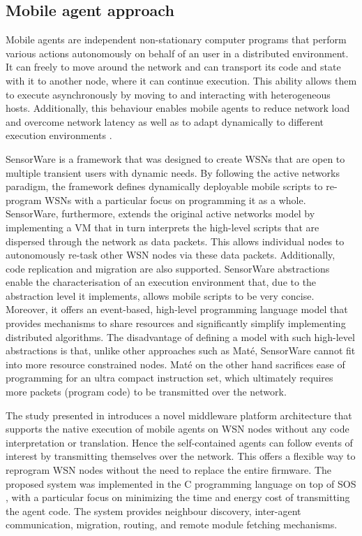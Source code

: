 \subsection{Mobile agent approach}
Mobile agents are independent non-stationary computer programs that perform various actions autonomously on behalf of an user in a distributed environment. It can freely to move around the network and can transport its  code and state with it to another node, where it can continue execution. This ability allows them to execute asynchronously by moving to and interacting with heterogeneous hosts. Additionally, this behaviour enables mobile agents to reduce network load and overcome network latency as well as to adapt dynamically to different execution environments \cite{Lange:1999:SGR:295685.298136}.



SensorWare \cite{Boulis03designand} is a framework that was designed to create WSNs that are open to multiple transient users with dynamic needs. By following the active networks paradigm, the framework defines dynamically deployable mobile scripts to re-program WSNs with a particular focus on programming it as a whole. SensorWare, furthermore, extends the original active networks model by implementing a VM that in turn interprets the high-level scripts that are dispersed through the network as data packets. This allows individual nodes to autonomously re-task other WSN nodes via these data packets. Additionally, code replication and migration are also supported. SensorWare abstractions enable the characterisation of an execution environment that, due to the abstraction level it implements, allows mobile scripts to be very concise. Moreover, it offers an event-based, high-level programming language model that provides mechanisms to share resources and significantly simplify implementing distributed algorithms. The disadvantage of defining a model with such high-level abstractions is that, unlike other approaches such as Maté, SensorWare cannot fit into more resource constrained nodes. Maté on the other hand sacrifices ease of programming for an ultra compact instruction set, which ultimately requires more packets (program code) to be transmitted over the network. 

The study presented in \cite{lynch2009middleware} introduces a novel middleware platform architecture that supports the native execution of mobile agents on WSN nodes without any code interpretation or translation. Hence the self-contained agents can follow events of interest by transmitting themselves over the network. This offers a flexible way to reprogram WSN nodes without the need to replace the entire firmware. The proposed system was implemented in the C programming language on top of SOS \cite{han2005dynamic}, with a particular focus on minimizing the time and energy cost of transmitting the agent code. The
system provides neighbour discovery, inter-agent communication, migration, routing, and remote module fetching mechanisms.

